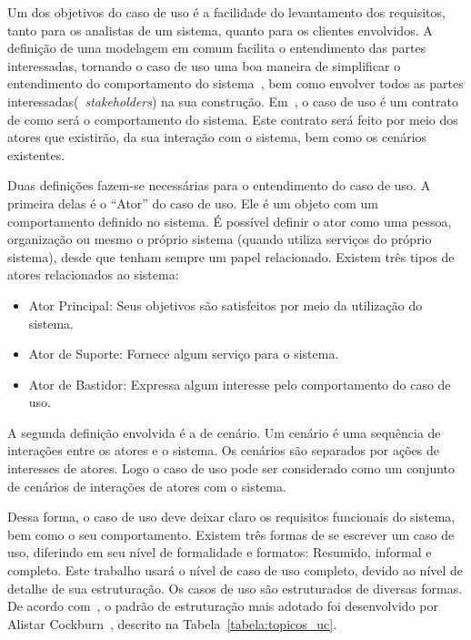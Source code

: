 Um dos objetivos do caso de uso é a facilidade do levantamento dos requisitos, tanto para os analistas de um sistema, quanto para os clientes envolvidos. A definição de uma modelagem em comum facilita o entendimento das partes interessadas, tornando o caso de uso uma boa maneira de simplificar o entendimento do comportamento do sistema~\cite{larman08}, bem como envolver todos as partes interessadas(~\emph{stakeholders}) na sua construção. Em~\cite{cockburn01}, o caso de uso é um contrato de como será o comportamento do sistema. Este contrato será feito por meio dos atores que existirão, da sua interação com o sistema, bem como os cenários existentes.

Duas definições fazem-se necessárias para o entendimento do caso de uso. A primeira delas é o ``Ator'' do caso de uso. Ele é um objeto com um comportamento definido no sistema. É possível definir o ator como uma pessoa, organização ou mesmo o próprio sistema (quando utiliza serviços do próprio sistema), desde que tenham sempre um papel relacionado. Existem três tipos de atores relacionados ao sistema:
\begin{itemize}
	\item Ator Principal: Seus objetivos são satisfeitos por meio da utilização do sistema.
	\item Ator de Suporte: Fornece algum serviço para o sistema.
	\item Ator de Bastidor: Expressa algum interesse pelo comportamento do caso de uso.
\end{itemize}

A segunda definição envolvida é a de cenário. Um cenário é uma sequência de interações entre os atores e o sistema. Os cenários são separados por ações de interesses de atores. Logo o caso de uso pode ser considerado como um conjunto de cenários de interações de atores com o sistema.

Dessa forma, o caso de uso deve deixar claro os requisitos funcionais do sistema, bem como o seu comportamento. Existem três formas de se escrever um caso de uso, diferindo em seu nível de formalidade e formatos: Resumido, informal e completo. Este trabalho usará o nível de caso de uso completo, devido ao nível de detalhe de sua estruturação. Os casos de uso são estruturados de diversas formas. De acordo com~\cite{larman08}, o padrão de estruturação mais adotado foi desenvolvido por Alistar Cockburn~\cite{cockburn01}, descrito na Tabela~\ref{tabela:topicos_uc}.

